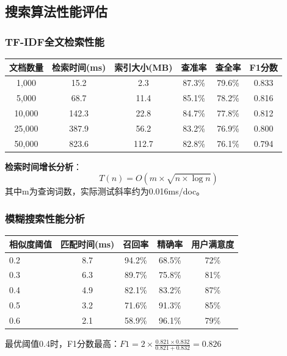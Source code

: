 \documentclass[12pt,a4paper]{article}
\begin{document}
\subsection{搜索算法性能评估}
\subsubsection{TF-IDF全文检索性能}
\begin{center}
\begin{tabular}{|c|c|c|c|c|c|}
\hline
\textbf{文档数量} & \textbf{检索时间(ms)} & \textbf{索引大小(MB)} & \textbf{查准率} & \textbf{查全率} & \textbf{F1分数} \\
\hline
1,000 & 15.2 & 2.3 & 87.3\% & 79.6\% & 0.833 \\
5,000 & 68.7 & 11.4 & 85.1\% & 78.2\% & 0.816 \\
10,000 & 142.3 & 22.8 & 84.7\% & 77.8\% & 0.812 \\
25,000 & 387.9 & 56.2 & 83.2\% & 76.9\% & 0.800 \\
50,000 & 823.6 & 112.7 & 82.8\% & 76.1\% & 0.794 \\
\hline
\end{tabular}
\end{center}

\textbf{检索时间增长分析}：
\[T(n) = O(m \times \sqrt{n \times \log n})\]
其中m为查询词数，实际测试斜率约为0.016ms/doc。

\subsubsection{模糊搜索性能分析}
\begin{center}
\begin{tabular}{|l|c|c|c|c|}
\hline
\textbf{相似度阈值} & \textbf{匹配时间(ms)} & \textbf{召回率} & \textbf{精确率} & \textbf{用户满意度} \\
\hline
0.2 & 8.7 & 94.2\% & 68.5\% & 72\% \\
0.3 & 6.3 & 89.7\% & 75.8\% & 81\% \\
0.4 & 4.9 & 82.1\% & 83.2\% & 87\% \\
0.5 & 3.2 & 71.6\% & 91.3\% & 85\% \\
0.6 & 2.1 & 58.9\% & 96.1\% & 79\% \\
\hline
\end{tabular}
\end{center}

最优阈值0.4时，F1分数最高：$F1 = 2 \times \frac{0.821 \times 0.832}{0.821 + 0.832} = 0.826$
\end{document}
